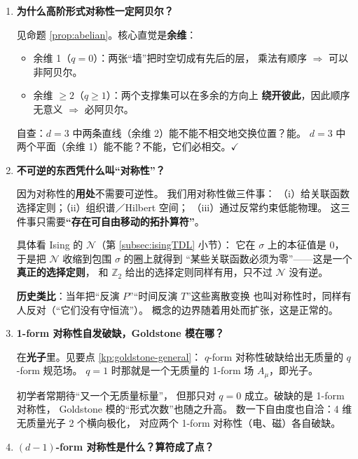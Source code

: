 \documentclass[UTF8,a4paper,11pt]{ctexart}
\theoremstyle{plain}
\theoremstyle{definition}
\theoremstyle{remark}
\newcommand{\ZZ}{\mathbb{Z}}
\begin{document}
\begin{enumerate}[label=\textbf{Q\arabic*.},ref=\arabic*,leftmargin=1.3cm]
\item \textbf{为什么高阶形式对称性一定阿贝尔？}
\label{q:abelian}

见命题 \ref{prop:abelian}。核心直觉是\textbf{余维}：
\begin{itemize}
  \item 余维 1（$q=0$）：两张“墙”把时空切成有先后的层，
        乘法有顺序 $\Rightarrow$ 可以非阿贝尔。
  \item 余维 $\ge2$（$q\ge1$）：两个支撑集可以在多余的方向上
        \textbf{绕开彼此}，因此顺序无意义 $\Rightarrow$ 必阿贝尔。
\end{itemize}
自查：$d=3$ 中两条直线（余维 2）能不能不相交地交换位置？能。
$d=3$ 中两个平面（余维 1）能不能？不能，它们必相交。$\checkmark$

\item \textbf{不可逆的东西凭什么叫“对称性”？}
\label{q:noninv}

因为对称性的\textbf{用处}不需要可逆性。
我们用对称性做三件事：
（i）给关联函数选择定则；（ii）组织谱／Hilbert 空间；
（iii）通过反常约束低能物理。
这三件事只需要\textbf{“存在可自由移动的拓扑算符”}。

具体看 Ising 的 $\mathcal N$（第 \ref{subsec:isingTDL} 小节）：
它在 $\sigma$ 上的本征值是 $0$，
于是把 $\mathcal N$ 收缩到包围 $\sigma$ 的圈上就得到
“某些关联函数必须为零”——这是一个\textbf{真正的选择定则}，
和 $\ZZ_2$ 给出的选择定则同样有用，只不过 $\mathcal N$ 没有逆。

\textbf{历史类比}：当年把“反演 $P$”“时间反演 $T$”这些离散变换
也叫对称性时，同样有人反对（“它们没有守恒流”）。
概念的边界随着用处而扩张，这是正常的。

\item \textbf{1-form 对称性自发破缺，Goldstone 模在哪？}
\label{q:goldstone}

在\textbf{光子}里。见要点 \ref{kp:goldstone-general}：
$q$-form 对称性破缺给出无质量的 $q$-form 规范场。
$q=1$ 时那就是一个无质量的 1-form 场 $A_\mu$，即光子。

初学者常期待“又一个无质量标量”，
但那只对 $q=0$ 成立。破缺的是 1-form 对称性，
Goldstone 模的“形式次数”也随之升高。
数一下自由度也自洽：4 维无质量光子 2 个横向极化，
对应两个 1-form 对称性（电、磁）各自破缺。

\item \textbf{$(d-1)$-form 对称性是什么？算符成了点？}
\label{q:dminus1}


\end{enumerate}
\end{document}
